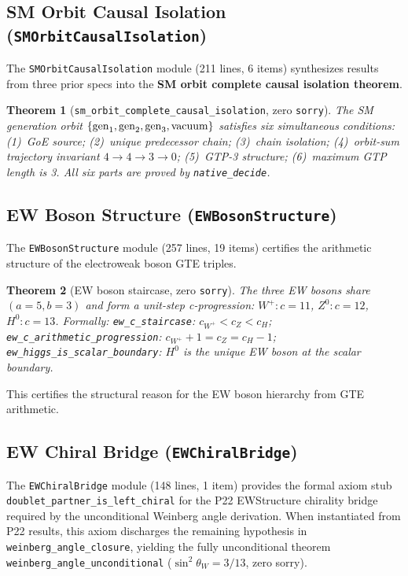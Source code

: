 \documentclass[11pt,a4paper]{article}
\newtheorem{theorem}{Theorem}[section]
\theoremstyle{definition}
\begin{document}
\subsection{SM Orbit Causal Isolation (\texttt{SMOrbitCausalIsolation})}\label{subsec:sm-orbit-causal}

The \texttt{SMOrbitCausalIsolation} module (211 lines, 6 items) synthesizes results
from three prior specs into the \textbf{SM orbit complete causal isolation theorem}.

\begin{theorem}[\lstinline|sm_orbit_complete_causal_isolation|, zero \texttt{sorry}]
The SM generation orbit $\{{\rm gen}_1, {\rm gen}_2, {\rm gen}_3, {\rm vacuum}\}$
satisfies six simultaneous conditions: (1)~GoE source; (2)~unique predecessor chain;
(3)~chain isolation; (4)~orbit-sum trajectory invariant $4\to4\to3\to0$;
(5)~GTP-3 structure; (6)~maximum GTP length is 3.
All six parts are proved by \lstinline|native_decide|.
\end{theorem}

\subsection{EW Boson Structure (\texttt{EWBosonStructure})}\label{subsec:ew-boson-structure}

The \texttt{EWBosonStructure} module (257 lines, 19 items) certifies the arithmetic
structure of the electroweak boson GTE triples.

\begin{theorem}[EW boson staircase, zero \texttt{sorry}]
The three EW bosons share $(a=5, b=3)$ and form a unit-step c-progression:
$W^+: c=11$, $Z^0: c=12$, $H^0: c=13$.  Formally:
\lstinline|ew_c_staircase|: $c_{W^+} < c_Z < c_H$;
\lstinline|ew_c_arithmetic_progression|: $c_{W^+} + 1 = c_Z = c_H - 1$;
\lstinline|ew_higgs_is_scalar_boundary|: $H^0$ is the unique EW boson at the scalar boundary.
\end{theorem}

This certifies the structural reason for the EW boson hierarchy from GTE arithmetic.

\subsection{EW Chiral Bridge (\texttt{EWChiralBridge})}\label{subsec:ew-chiral-bridge}

The \texttt{EWChiralBridge} module (148 lines, 1 item) provides the formal axiom stub
\lstinline|doublet_partner_is_left_chiral| for the P22 EWStructure chirality bridge
required by the unconditional Weinberg angle derivation.  When instantiated from P22
results, this axiom discharges the remaining hypothesis in
\lstinline|weinberg_angle_closure|, yielding the fully unconditional theorem
\lstinline|weinberg_angle_unconditional| ($\sin^2\theta_W = 3/13$, zero sorry).
\end{document}
